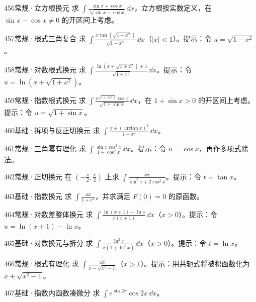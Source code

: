 \begin{exercise}{456}{常规·立方根换元}
求 $\int\frac{\sin x+\cos x}{\sqrt[3]{\sin x-\cos x}}\,\dd x$，立方根按实数定义，在 $\sin x-\cos x\ne0$ 的开区间上考虑。
\end{exercise}
\begin{exercise}{457}{常规·根式三角复合}
求 $\int\frac{x\tan(\sqrt{1-x^2})}{\sqrt{1-x^2}}\,\dd x$（$|x|<1$）。提示：令 $u=\sqrt{1-x^2}$。
\end{exercise}
\begin{exercise}{458}{常规·对数根式换元}
求 $\int\frac{\ln(x+\sqrt{1+x^2})+1}{\sqrt{1+x^2}}\,\dd x$。提示：令 $u=\ln(x+\sqrt{1+x^2})$。
\end{exercise}
\begin{exercise}{459}{常规·指数根式换元}
求 $\int\frac{e^{\sqrt{1+\sin x}}\cos x}{\sqrt{1+\sin x}}\,\dd x$，在 $1+\sin x>0$ 的开区间上考虑。提示：令 $u=\sqrt{1+\sin x}$。
\end{exercise}
\begin{exercise}{460}{基础·拆项与反正切换元}
求 $\int\frac{x+(\arctan x)^2}{1+x^2}\,\dd x$。
\end{exercise}
\begin{exercise}{461}{常规·三角幂有理化}
求 $\int\frac{\sin x\cos^3x}{1+\cos^2x}\,\dd x$。提示：令 $u=\cos x$，再作多项式除法。
\end{exercise}
\begin{exercise}{462}{常规·正切换元}
在 $(-\frac{\pi}{2},\frac{\pi}{2})$ 上求 $\int\frac{\dd x}{\sin^2x+2\cos^2x}$。提示：令 $t=\tan x$。
\end{exercise}
\begin{exercise}{463}{基础·指数换元}
求 $\int\frac{\dd x}{1+e^x}$，并求满足 $F(0)=0$ 的原函数。
\end{exercise}
\begin{exercise}{464}{常规·对数差整体换元}
求 $\int\frac{\ln(x+1)-\ln x}{x(x+1)}\,\dd x$（$x>0$）。提示：令 $u=\ln(x+1)-\ln x$。
\end{exercise}
\begin{exercise}{465}{基础·对数换元与拆分}
求 $\int\frac{\ln^2x}{x(1+\ln^2x)}\,\dd x$（$x>0$）。提示：令 $t=\ln x$。
\end{exercise}
\begin{exercise}{466}{常规·根式有理化}
求 $\int\frac{\dd x}{x-\sqrt{x^2-1}}$（$x>1$）。提示：用共轭式将被积函数化为 $x+\sqrt{x^2-1}$。
\end{exercise}
\begin{exercise}{467}{基础·指数内函数凑微分}
求 $\int e^{\sin2x}\cos2x\,\dd x$。
\end{exercise}
